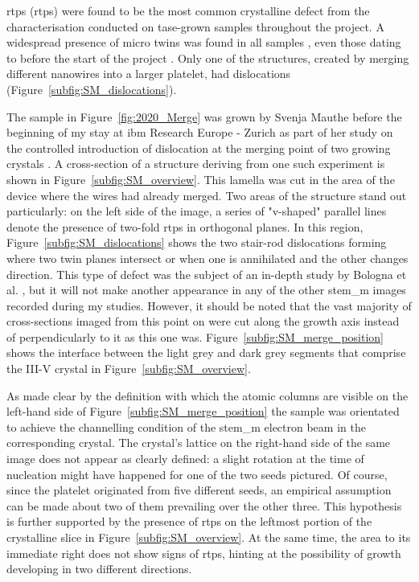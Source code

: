 \Acl{rtp}s (\acs{rtp}s) were found to be the most common crystalline defect from the characterisation conducted on \acs{tase}-grown samples throughout the project. A widespread presence of micro twins was found in all samples \cite{Brugnolotto2023, Brugnolotto2023_2}, even those dating to before the start of the project \cite{Staudinger2018}. Only one of the structures, created by merging different nanowires into a larger platelet, had dislocations (Figure~\ref{subfig:SM_dislocations}). 

The sample in Figure~\ref{fig:2020_Merge} was grown by Svenja Mauthe before the beginning of my stay at \acs{ibm} Research Europe - Zurich as part of her study on the controlled introduction of dislocation at the merging point of two growing crystals \cite{Mauthe2021}. A cross-section of a structure deriving from one such experiment is shown in Figure~\ref{subfig:SM_overview}. This lamella was cut in the area of the device where the wires had already merged. Two areas of the structure stand out particularly: on the left side of the image, a series of "v-shaped" parallel lines denote the presence of two-fold \acf{rtp}s in orthogonal  planes. In this region, Figure~\ref{subfig:SM_dislocations} shows the two stair-rod dislocations forming where two twin planes intersect or when one is annihilated and the other changes direction. This type of defect was the subject of an in-depth study by Bologna et al. \cite{Bologna2018}, but it will not make another appearance in any of the other \acf{stem_m} images recorded during my studies. However, it should be noted that the vast majority of cross-sections imaged from this point on were cut along the growth axis instead of perpendicularly to it as this one was. Figure~\ref{subfig:SM_merge_position} shows the interface between the light grey and dark grey segments that comprise the III-V crystal in Figure~\ref{subfig:SM_overview}. 

As made clear by the definition with which the atomic columns are visible on the left-hand side of Figure~\ref{subfig:SM_merge_position} the sample was orientated to achieve the channelling condition of the \acs{stem_m} electron beam in the corresponding crystal. The crystal's lattice on the right-hand side of the same image does not appear as clearly defined: a slight rotation at the time of nucleation might have happened for one of the two seeds pictured. Of course, since the platelet originated from five different seeds, an empirical assumption can be made about two of them prevailing over the other three. This hypothesis is further supported by the presence of \acs{rtp}s on the leftmost portion of the crystalline slice in Figure~\ref{subfig:SM_overview}. At the same time, the area to its immediate right does not show signs of \acs{rtp}s, hinting at the possibility of growth developing in two different directions. 

